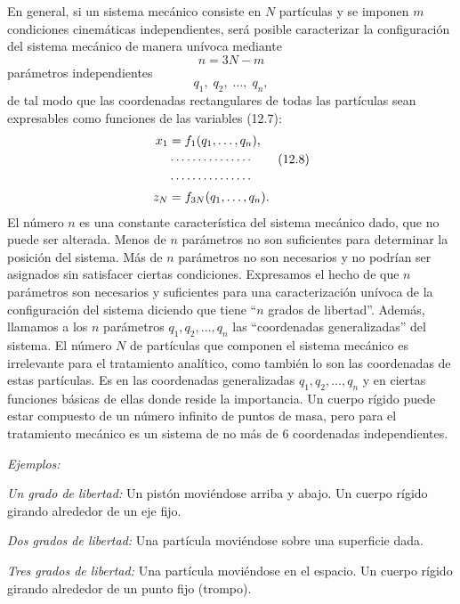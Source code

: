 \documentclass[12pt,a4paper]{book}
\begin{document}
En general, si un sistema mec\'anico consiste en $N$ part\'iculas y se imponen $m$ condiciones cinem\'aticas independientes, ser\'a posible caracterizar la configuraci\'on del sistema mec\'anico de manera un\'ivoca mediante
\begin{equation}
n = 3N - m
\tag{12.6}
\end{equation}
par\'ametros independientes
\begin{equation}
q_1,\; q_2,\; \ldots,\; q_n,
\tag{12.7}
\end{equation}
de tal modo que las coordenadas rectangulares de todas las part\'iculas sean expresables como funciones de las variables (12.7):
\begin{align}
x_1 &= f_1(q_1, \ldots, q_n), \notag\\
&\cdots\cdots\cdots\cdots\cdots \tag{12.8}\\
&\cdots\cdots\cdots\cdots\cdots \notag\\
z_N &= f_{3N}(q_1, \ldots, q_n). \notag
\end{align}
El n\'umero $n$ es una constante caracter\'istica del sistema mec\'anico dado, que no puede ser alterada. Menos de $n$ par\'ametros no son suficientes para determinar la posici\'on del sistema. M\'as de $n$ par\'ametros no son necesarios y no podr\'ian ser asignados sin satisfacer ciertas condiciones. Expresamos el hecho de que $n$ par\'ametros son necesarios y suficientes para una caracterizaci\'on un\'ivoca de la configuraci\'on del sistema diciendo que tiene ``$n$ grados de libertad''. Adem\'as, llamamos a los $n$ par\'ametros $q_1, q_2, \ldots, q_n$ las ``coordenadas generalizadas'' del sistema. El n\'umero $N$ de part\'iculas que componen el sistema mec\'anico es irrelevante para el tratamiento anal\'itico, como tambi\'en lo son las coordenadas de estas part\'iculas. Es en las coordenadas generalizadas $q_1, q_2, \ldots, q_n$ y en ciertas funciones b\'asicas de ellas donde reside la importancia. Un cuerpo r\'igido puede estar compuesto de un n\'umero infinito de puntos de masa, pero para el tratamiento mec\'anico es un sistema de no m\'as de 6 coordenadas independientes.

\bigskip

\textit{Ejemplos:}

\textit{Un grado de libertad:} Un pist\'on movi\'endose arriba y abajo. Un cuerpo r\'igido girando alrededor de un eje fijo.

\textit{Dos grados de libertad:} Una part\'icula movi\'endose sobre una superficie dada.

\textit{Tres grados de libertad:} Una part\'icula movi\'endose en el espacio. Un cuerpo r\'igido girando alrededor de un punto fijo (trompo).
\end{document}
